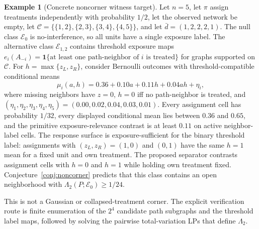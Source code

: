 \documentclass[11pt]{article}
\newcommand{\one}{\mathbf{1}}
\theoremstyle{definition}
\newtheorem{example}{Example}
\theoremstyle{plain}
\theoremstyle{remark}
\begin{document}
\begin{example}[Concrete noncorner witness target]\label{ex:witness}
Let \(n=5\), let \(\pi\) assign treatments independently with probability \(1/2\), let the observed network be empty, let \(\mathcal C=\{\{1,2\},\{2,3\},\{3,4\},\{4,5\}\}\), and let \(\bar d=(1,2,2,2,1)\).  The null class \(\mathcal E_0\) is no-interference, so all units have a single exposure label.  The alternative class \(\mathcal E_{1,2}\) contains threshold exposure maps \(e_i(A_{-i})=\one\{\text{at least one path-neighbor of }i\text{ is treated}\}\) for graphs supported on \(\mathcal C\).  For \(h=\max\{z_L,z_R\}\), consider Bernoulli outcomes with threshold-compatible conditional means
\[
\mu_i(a,h)=0.36+0.10a+0.11h+0.04ah+\eta_i,
\]
where missing neighbors have \(z=0\), \(h=0\) iff no path-neighbor is treated, and \((\eta_1,\eta_2,\eta_3,\eta_4,\eta_5)=(0.00,0.02,0.04,0.03,0.01)\).  Every assignment cell has probability \(1/32\), every displayed conditional mean lies between \(0.36\) and \(0.65\), and the primitive exposure-relevance contrast is at least \(0.11\) on active neighbor-label cells.  The response surface is exposure-sufficient for the binary threshold label: assignments with \((z_L,z_R)=(1,0)\) and \((0,1)\) have the same \(h=1\) mean for a fixed unit and own treatment.  The proposed separator contrasts assignment cells with \(h=0\) and \(h=1\) while holding own treatment fixed.  Conjecture~\ref{conj:noncorner} predicts that this class contains an open neighborhood with \(\Lambda_2(P;\mathcal E_0)\ge1/24\).
\end{example}
This is not a Gaussian or collapsed-treatment corner.  The explicit verification route is finite enumeration of the \(2^4\) candidate path subgraphs and the threshold label maps, followed by solving the pairwise total-variation LPs that define \(\Lambda_2\).
\end{document}
